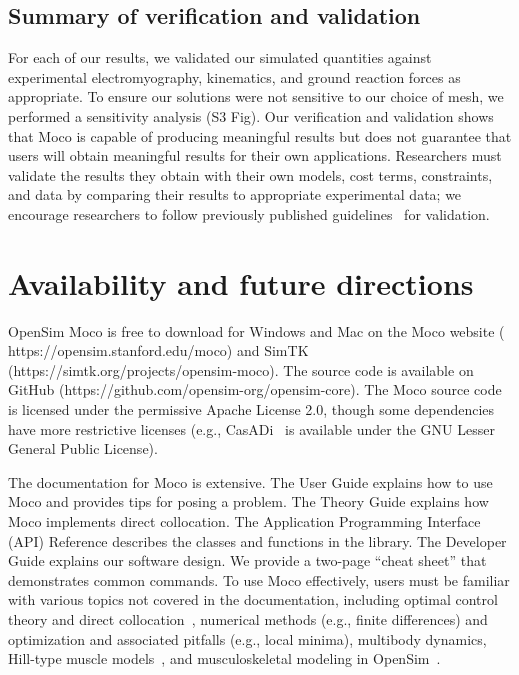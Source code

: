 \documentclass[10pt,letterpaper]{article}
\begin{document}
\subsection*{Summary of verification and validation}

For each of our results, we validated our simulated quantities against experimental electromyography, kinematics, and ground reaction forces as appropriate. To ensure our solutions were not sensitive to our choice of mesh, we performed a sensitivity analysis (S3 Fig). Our verification and validation shows that Moco is capable of producing meaningful results but does not guarantee that users will obtain meaningful results for their own applications. Researchers must validate the results they obtain with their own models, cost terms, constraints, and data by comparing their results to appropriate experimental data; we encourage researchers to follow previously published guidelines~\cite{Hicks:2015bo} for validation.

\section*{Availability and future directions}

OpenSim Moco is free to download for Windows and Mac on the Moco website (\\https://opensim.stanford.edu/moco) and SimTK (https://simtk.org/projects/opensim-moco). The source code is available on GitHub (https://github.com/opensim-org/opensim-core). The Moco source code is licensed under the permissive Apache License 2.0, though some dependencies have more restrictive licenses (e.g., CasADi~\cite{Andersson:2019} is available under the GNU Lesser General Public License).

The documentation for Moco is extensive. The User Guide explains how to use Moco and provides tips for posing a problem. The Theory Guide explains how Moco implements direct collocation. The Application Programming Interface (API) Reference describes the classes and functions in the library. The Developer Guide explains our software design. We provide a two-page ``cheat sheet'' that demonstrates common commands. To use Moco effectively, users must be familiar with various topics not covered in the documentation, including optimal control theory and direct collocation~\cite{Betts:2010}, numerical methods (e.g., finite differences) and optimization and associated pitfalls (e.g., local minima), multibody dynamics, Hill-type muscle models~\cite{Groote:2016dq}, and musculoskeletal modeling in OpenSim~\cite{Seth:2018gg}.
\end{document}
